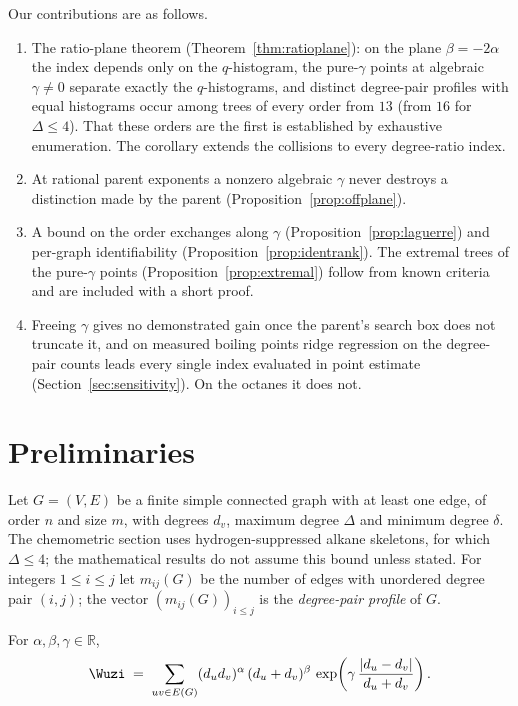   Our contributions are as follows.
  \begin{enumerate}
  \item[(i)] The ratio-plane theorem (Theorem~\ref{thm:ratioplane}):
  on the plane $\beta = -2\alpha$ the index depends only on the
  $q$-histogram, the pure-$\gamma$ points at algebraic $\gamma \neq 0$
  separate exactly the $q$-histograms, and distinct degree-pair profiles
  with equal histograms occur among trees of every order from $13$
  (from $16$ for $\Delta \le 4$). That these orders are the first is
  established by exhaustive enumeration. The corollary extends the
  collisions to every degree-ratio index.
  \item[(ii)] At rational parent exponents a nonzero algebraic $\gamma$
  never destroys a distinction made by the parent
  (Proposition~\ref{prop:offplane}).
  \item[(iii)] A bound on the order exchanges along $\gamma$
  (Proposition~\ref{prop:laguerre}) and per-graph identifiability
  (Proposition~\ref{prop:identrank}). The extremal trees of the
  pure-$\gamma$ points (Proposition~\ref{prop:extremal}) follow from
  known criteria and are included with a short proof.
  \item[(iv)] Freeing $\gamma$ gives no demonstrated gain once the
  parent's search box does not truncate it, and on measured boiling points
  ridge regression on the degree-pair counts leads every single index
  evaluated in point estimate (Section~\ref{sec:sensitivity}). On the octanes it does not.
  \end{enumerate}

\section{Preliminaries}\label{sec:prelim}

Let $G = (V, E)$ be a finite simple connected graph with at least one
edge, of order $n$ and size $m$, with degrees $d_v$, maximum degree
$\Delta$ and minimum degree $\delta$. The chemometric section uses
hydrogen-suppressed alkane skeletons, for which $\Delta \le 4$; the
mathematical results do not assume this bound unless stated. For
integers $1 \le i \le j$ let $m_{ij}(G)$ be the number of edges with
unordered degree pair $(i,j)$; the vector $(m_{ij}(G))_{i \le j}$ is the
\emph{degree-pair profile} of $G$.

\begin{definition}\label{def:wuzi}
For $\alpha, \beta, \gamma \in \mathbb{R}$,
\begin{equation}\label{eq:wuzi}
\Wuzi
\;=\; \sum_{uv \in E(G)}
(d_u d_v)^{\alpha}\,(d_u + d_v)^{\beta}\,
\exp\!\left(\gamma\,\frac{|d_u - d_v|}{d_u + d_v}\right).
\end{equation}
\end{definition}

